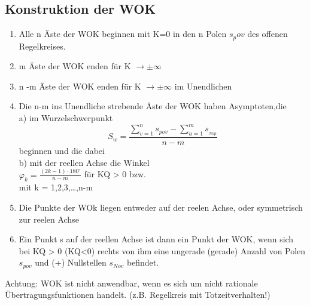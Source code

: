 \documentclass[10pt,a4paper]{article}
\begin{document}
  \subsection{Konstruktion der WOK}
  \begin{mdframed}[style=exercise]
      \begin{enumerate}
        \item Alle n Äste der WOK beginnen mit K=0 in den n Polen $s_pov$ des offenen Regelkreises.
        \item m Äste der WOK enden für K $\rightarrow \pm \infty$
        \item n -m Äste der WOK enden für K $\rightarrow \pm \infty$ im Unendlichen
        \item Die n-m ins Unendliche strebende Äste der WOK haben Asymptoten,die\\
            a) im Wurzelschwerpunkt
            \[S_{w}=\frac{\sum_{v=1}^{n} s_{pov}-\sum_{u=1}^{m} s_{_{Nop}}}{n-m}\]
            beginnen und die dabei\\
            b) mit der reellen Achse die Winkel\\
            $\varphi_{k}=\frac{(2 k-1) \cdot 180^{\circ}}{n-m}$ für KQ > 0 bzw.\\
            mit k = 1,2,3,\dots,n-m
        \item Die Punkte der WOk liegen entweder auf der reelen Achse, oder symmetrisch zur reelen Achse
        \item Ein Punkt s auf der reellen Achse ist dann ein Punkt der WOK, wenn sich bei KQ > 0 (KQ<0)
            rechts von ihm eine ungerade (gerade) Anzahl von Polen $s_{pov}$ und (+) Nullstellen $s_{Nov}$ befindet.
\end{enumerate}
Achtung: WOK ist nicht anwendbar, wenn es sich um nicht rationale Übertragungsfunktionen handelt.
 (z.B. Regelkreis mit Totzeitverhalten!)
  \end{mdframed}
\end{document}
